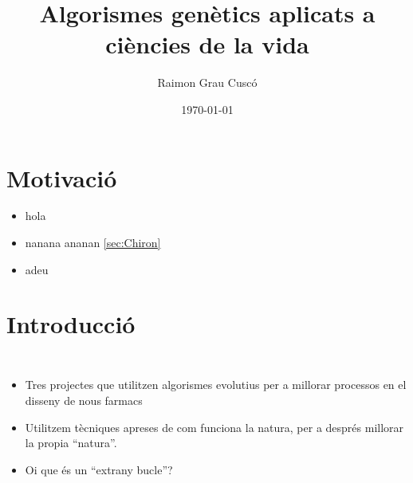 \documentclass{beamer}
\begin{document}
\title{Algorismes genètics aplicats a ciències de la vida}
\author{Raimon Grau Cuscó}
\date{\today}


\frame{\titlepage} 


\section{Motivació} %
\label{sec:Motivacio}
\begin{itemize}
	\item hola
	\item nanana ananan \ref{sec:Chiron}
	\item adeu
\end{itemize}


\section{Introducció} %

\begin{frame}
	\begin{columns}[c]
		\begin{itemize}
			\item Tres projectes que utilitzen algorismes evolutius per a millorar processos en el
				disseny de nous farmacs
			\item Utilitzem tècniques apreses de com funciona la natura, per a després millorar la
				propia ``natura''.
			\item Oi que és un ``extrany bucle''?
		\end{itemize}
	\end{columns}
\end{frame}
\end{document}
